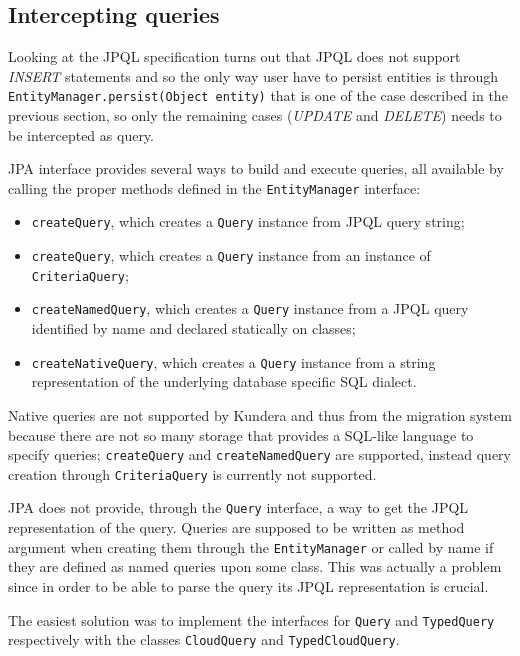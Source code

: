 \subsection{Intercepting queries}
Looking at the JPQL specification \cite{book:projpa2} turns out that JPQL does not support \textit{INSERT} statements and so the only way user have to persist entities is through \texttt{EntityManager.persist(Object entity)} that is one of the case described in the previous section, so only the remaining cases (\textit{UPDATE} and \textit{DELETE}) needs to be intercepted as query.

\noindent JPA interface provides several ways to build and execute queries, all available by calling the proper methods defined in the \texttt{EntityManager} interface: 
\begin{itemize}
\item \texttt{createQuery}, which creates a \texttt{Query} instance from JPQL query string;
\item \texttt{createQuery}, which creates a \texttt{Query} instance from an instance of \texttt{CriteriaQuery};
\item \texttt{createNamedQuery}, which creates a \texttt{Query} instance from a JPQL query identified by name and declared statically on classes; 
\item \texttt{createNativeQuery}, which creates a \texttt{Query} instance from a string representation of the underlying database specific SQL dialect.
\end{itemize}
 
\noindent Native queries are not supported by Kundera and thus from the migration system because there are not so many storage that provides a SQL-like language to specify queries; \texttt{createQuery} and \texttt{createNamedQuery} are supported, instead query creation through \texttt{CriteriaQuery} is currently not supported.

\newparagraph JPA does not provide, through the \texttt{Query} interface, a way to get the JPQL representation of the query. Queries are supposed to be written as method argument when creating them through the \texttt{EntityManager} or called by name if they are defined as named queries upon some class.
This was actually a problem since in order to be able to parse the query its JPQL representation is crucial.

\noindent The easiest solution was to implement the interfaces for \texttt{Query} and \texttt{TypedQuery} respectively with the classes \texttt{CloudQuery} and \texttt{TypedCloudQuery}. 

